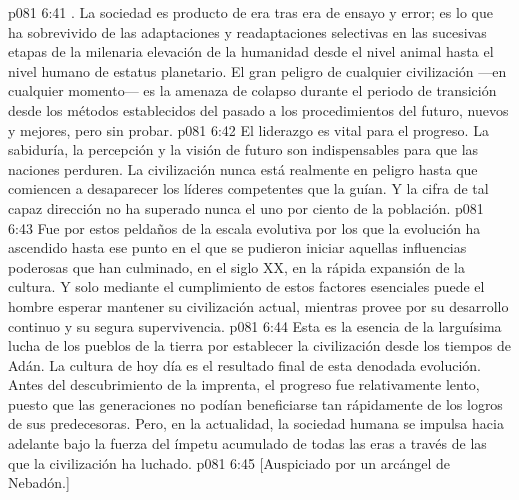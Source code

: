 \vs p081 6:41 . La sociedad es producto de era tras era de ensayo y error; es lo que ha sobrevivido de las adaptaciones y readaptaciones selectivas en las sucesivas etapas de la milenaria elevación de la humanidad desde el nivel animal hasta el nivel humano de estatus planetario. El gran peligro de cualquier civilización ---en cualquier momento--- es la amenaza de colapso durante el periodo de transición desde los métodos establecidos del pasado a los procedimientos del futuro, nuevos y mejores, pero sin probar.
\vs p081 6:42 El liderazgo es vital para el progreso. La sabiduría, la percepción y la visión de futuro son indispensables para que las naciones perduren. La civilización nunca está realmente en peligro hasta que comiencen a desaparecer los líderes competentes que la guían. Y la cifra de tal capaz dirección no ha superado nunca el uno por ciento de la población.
\vs p081 6:43 Fue por estos peldaños de la escala evolutiva por los que la evolución ha ascendido hasta ese punto en el que se pudieron iniciar aquellas influencias poderosas que han culminado, en el siglo XX, en la rápida expansión de la cultura. Y solo mediante el cumplimiento de estos factores esenciales puede el hombre esperar mantener su civilización actual, mientras provee por su desarrollo continuo y su segura supervivencia.
\vs p081 6:44 \pc Esta es la esencia de la larguísima lucha de los pueblos de la tierra por establecer la civilización desde los tiempos de Adán. La cultura de hoy día es el resultado final de esta denodada evolución. Antes del descubrimiento de la imprenta, el progreso fue relativamente lento, puesto que las generaciones no podían beneficiarse tan rápidamente de los logros de sus predecesoras. Pero, en la actualidad, la sociedad humana se impulsa hacia adelante bajo la fuerza del ímpetu acumulado de todas las eras a través de las que la civilización ha luchado.
\vsetoff
\vs p081 6:45 [Auspiciado por un arcángel de Nebadón.]

